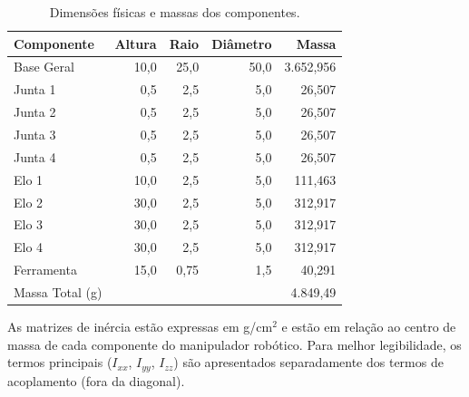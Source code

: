 \begin{table}[H]
\centering
\caption{Dimensões físicas e massas dos componentes.}
\label{tab:parametros_fisicos1}
\begin{tabular}{lrrrr}
\toprule
Componente & Altura & Raio & Diâmetro & Massa \\
\midrule
Base Geral   & 10{,}0  & 25{,}0   & 50{,}0      & 3.652{,}956 \\
Junta 1      & 0{,}5   & 2{,}5    & 5{,}0       & 26{,}507 \\
Junta 2      & 0{,}5   & 2{,}5    & 5{,}0       & 26{,}507 \\
Junta 3      & 0{,}5   & 2{,}5    & 5{,}0       & 26{,}507 \\
Junta 4      & 0{,}5   & 2{,}5    & 5{,}0       & 26{,}507 \\
Elo 1        & 10{,}0  & 2{,}5    & 5{,}0       & 111{,}463 \\
Elo 2        & 30{,}0  & 2{,}5    & 5{,}0       & 312{,}917 \\
Elo 3        & 30{,}0  & 2{,}5    & 5{,}0       & 312{,}917 \\
Elo 4        & 30{,}0  & 2{,}5    & 5{,}0       & 312{,}917 \\
Ferramenta   & 15{,}0  & 0{,}75   & 1{,}5       & 40{,}291 \\
\midrule
Massa Total (g) &&&& 4.849,49 \\ 
\bottomrule
\end{tabular}
\end{table}

As matrizes de inércia estão expressas em g/cm$^{2}$ e estão em relação ao centro de massa de cada componente do manipulador robótico.
Para melhor legibilidade, os termos principais
($I_{xx}$, $I_{yy}$, $I_{zz}$)
são apresentados separadamente dos termos de acoplamento (fora da diagonal).  


